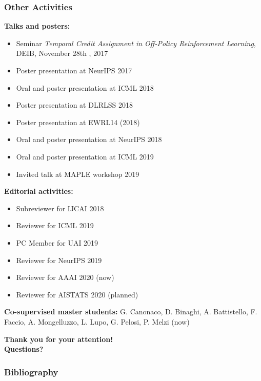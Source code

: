 \documentclass[aspectratio=169]{beamer}
\begin{document}
\begin{frame}
\frametitle{Other Activities}
\tiny
\textbf{Talks and posters:}
\begin{itemize}
	\item Seminar \emph{Temporal Credit Assignment in Off-Policy Reinforcement Learning}, DEIB, November 28th , 2017
	\item Poster presentation at NeurIPS 2017
	\item Oral and poster presentation at ICML 2018
	\item Poster presentation at DLRLSS 2018
	\item Poster presentation at EWRL14 (2018)
	\item Oral and poster presentation at NeurIPS 2018
	\item Oral and poster presentation at ICML 2019
	\item Invited talk at MAPLE workshop 2019
\end{itemize}

\vfill
\textbf{Editorial activities:}
\begin{itemize}
	\item Subreviewer for IJCAI 2018
	\item Reviewer for ICML 2019
	\item PC Member for UAI 2019
	\item Reviewer for NeurIPS 2019
	\item Reviewer for AAAI 2020 (now)
	\item Reviewer for AISTATS 2020 (planned)
\end{itemize}

\vfill
\textbf{Co-supervised master students:} G. Canonaco, D. Binaghi, A. Battistello, F. Faccio, A. Mongelluzzo, L. Lupo, G. Pelosi, P. Melzi (now)
\end{frame}



\begin{frame}[plain]
\centering
{\color{poliblue3} \bf
\vspace{1cm}
{\huge Thank you for your attention!} \\
\vspace{2cm}
{\LARGE Questions?}
}
\end{frame}


\begin{frame}[allowframebreaks]
\frametitle{Bibliography}
\scriptsize


\end{frame}

\end{document}

